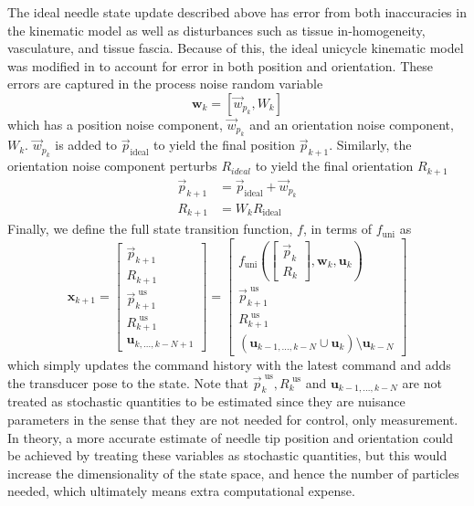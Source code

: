 \documentclass[journal,transmag]{IEEEtran}
\newcommand{\bvar}[2]{\mathbf{#1}_{#2}}
\newcommand{\usorientation}[1][k]{R^{\text{ us}}_{#1}}
\newcommand{\uspos}[1][k]{\vec{p}^{\text{ us}}_{#1}}
\begin{document}
The ideal needle state update described above has error from both inaccuracies in the kinematic model as well as disturbances such as tissue in-homogeneity, vasculature, and tissue fascia.  Because of this, the ideal unicycle kinematic model was modified in \cite{adebar2014recursive} to account for error in both position and orientation.  These errors are captured in the process noise random variable 
\begin{equation*}
\bvar{w}{k} = \left[\vec{w}_{p_k}, W_{k}\right]
\end{equation*}  
which has a position noise component, $\vec{w}_{p_k}$ and an orientation noise component, $W_{k}$.  $\vec{w}_{p_k}$ is added to $\vec{p}_{\text{ideal}}$ to yield the final position $\vec{p}_{k+1}$.
Similarly, the orientation noise component perturbs $R_{ideal}$ to yield the final orientation $R_{k+1}$
\begin{align*}
\vec{p}_{k+1} &= \vec{p}_{\text{ideal}}+\vec{w}_{p_k} \\
R_{k+1} &= W_{k}R_{\text{ideal}}
\end{align*}
Finally, we define the full state transition function, $f$, in terms of $f_{\text{uni}}$ as 
\renewcommand*{\arraystretch}{1.2}
\begin{equation*}
\bvar{x}{k+1} = \begin{bmatrix} \vec{p}_{k+1} \\ 
								R_{k+1} 	  \\ 
								\uspos[k+1] \\ 
								\usorientation[k+1] \\
								\bvar{u}{k,...,k-N+1}
				\end{bmatrix}
				=
				\begin{bmatrix}
				f_{\text{uni}}\left(\begin{bmatrix} \vec{p}_k \\ R_k \end{bmatrix}, \bvar{w}{k}, \bvar{u}{k} \right) \\
				\uspos[k+1] \\
				\usorientation[k+1]		\\
				(\bvar{u}{k-1,...,k-N} \cup \bvar{u}{k}) \setminus \bvar{u}{k-N}
				\end{bmatrix}								
\end{equation*}
which simply updates the command history with the latest command and adds the transducer pose to the state.  Note that $\uspos, \usorientation$ and $\bvar{u}{k-1,...,k-N}$ are not treated as stochastic quantities to be estimated since they are nuisance parameters in the sense that they are not needed for control, only measurement.  In theory, a more accurate estimate of needle tip position and orientation could be achieved by treating these variables as stochastic quantities, but this would increase the dimensionality of the state space, and hence the number of particles needed, which ultimately means extra computational expense.
\end{document}
